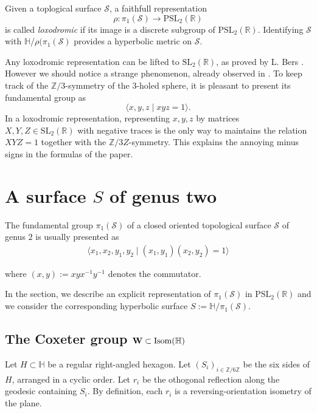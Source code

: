 \documentclass[12pt]{amsart}
\newcommand{\HP}{\mathbb{H}}
\newcommand{\R}{\mathbb{R}}
\newcommand{\Z}{\mathbb{Z}}
\newcommand{\Isom}{\mathrm{Isom}}
\newcommand{\PSL}{{\mathrm {PSL}}}
\newcommand{\SL}{{\mathrm {SL}}}
\newcommand{\cS}{\mathcal{S}}
\begin{document}
Given a toplogical  surface $\cS$, a 
 faithfull representation 
$$\rho:\pi_1(\cS)\to\PSL_2(\R)$$
 is called {\it loxodromic} if its
image is a discrete subgroup of $\PSL_2(\R)$. Identifying
$\cS$ with $\HP/\rho(\pi_1(\cS)$ provides a hyperbolic metric
on $\cS$.

Any loxodromic representation can be lifted
to $\SL_2(\R)$, as  proved by L. Bers \cite{Bers}. 
However we should notice a strange phenomenon, already observed in \cite{Bers}. To keep track of the 
$\Z/3$-symmetry of the $3$-holed sphere, it is pleasant to present its fundamental group as
$$\langle x, y, z\mid xyz=1\rangle.$$
In a loxodromic representation, representing $x, y, z$ by matrices 
$X, Y, Z \in \SL_2(\R)$ with negative traces is the only way to maintains the relation
$XYZ=1$ together with the $\Z/3Z$-symmetry. This explains the 
annoying minus signs in the formulas of the paper.











\section{A surface $S$ of genus two}

The fundamental group  $\pi_1(\cS)$ 
of a closed oriented topological surface $\cS$ of genus $2$ is usually presented as
\begin{align}\langle x_1,x_2,y_1,y_2\mid 
(x_1,y_1)(x_2,y_2)=1\rangle \label{standard}\end{align}

\noindent
where  $(x,y):=xyx^{-1}y^{-1}$ denotes
the commutator. 

In the section, we describe an explicit representation of $\pi_1(\cS)$  in 
$\PSL_2(\R)$ and we consider the corresponding hyperbolic surface 
$S:=\HP/\pi_1(\cS)$.

\subsection{The Coxeter group  ${\bf W}\subset \Isom(\HP)$}

Let  $H\subset\HP$ be a regular right-angled hexagon. 
Let $(S_i)_{i\in\Z/6\Z}$ be the six sides of $H$, arranged in a cyclic order. Let $r_i$ be the
othogonal reflection along the geodesic containing $S_i$. By definition, each $r_i$ is a 
reversing-orientation isometry of the plane.
\end{document}
